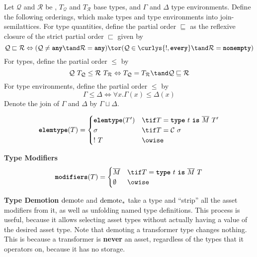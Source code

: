 \documentclass[10pt]{article}
\begin{document}
\begin{definition}
    Let $\mathcal{Q}$ and $\mathcal{R}$ be \typeQuantities, $T_\mathcal{Q}$ and $T_\mathcal{R}$ base types, and $\Gamma$ and $\Delta$ type environments.
    Define the following orderings, which make types and type environments into join-semilattices.
    For type quantities, define the partial order $\sqsubseteq$ as the reflexive closure of the strict partial order $\sqsubset$ given by
    \[
        \mathcal{Q} \sqsubset \mathcal{R} \iff (\mathcal{Q} \neq \any \tand \mathcal{R} = \any) \tor (\mathcal{Q} \in \curlys{\exactlyone, \every} \tand \mathcal{R} = \nonempty)
    \]
    For types, define the partial order $\leq$ by
    \[
        \mathcal{Q}~T_\mathcal{Q} \leq \mathcal{R}~T_\mathcal{R} \iff T_\mathcal{Q} = T_\mathcal{R} \tand \mathcal{Q} \sqsubseteq \mathcal{R}
    \]
    For type environments, define the partial order $\leq$ by
    \[
        \Gamma \leq \Delta \iff \forall x. \Gamma(x) \leq \Delta(x)
    \]
    Denote the join of $\Gamma$ and $\Delta$ by $\Gamma \sqcup \Delta$.
\end{definition}

\begin{align*}
    \elemtype(T) =
    \begin{cases}
        \elemtype(T') & \tif T = \type~t~\is~\overline{M}~T' \\
        \sigma & \tif T = \mathcal{C}~\sigma \\
        !~T & \owise
    \end{cases}
\end{align*}

 \textbf{Type Modifiers}
\begin{align*}
    \modifiers(T) =
    \begin{cases}
        \overline{M} & \tif T = \type~t~\is~\overline{M}~T \\
        \emptyset & \owise
    \end{cases}
\end{align*}

\framebox{$\demote(\tau) = \sigma$}
 \textbf{Type Demotion}
$\text{demote}$ and $\text{demote}_*$ take a type and ``strip'' all the asset modifiers from it, as well as unfolding named type definitions.
This process is useful, because it allows selecting asset types without actually having a value of the desired asset type.
Note that demoting a transformer type changes nothing.
This is because a transformer is \textbf{never} an asset, regardless of the types that it operators on, because it has no storage.
\end{document}
